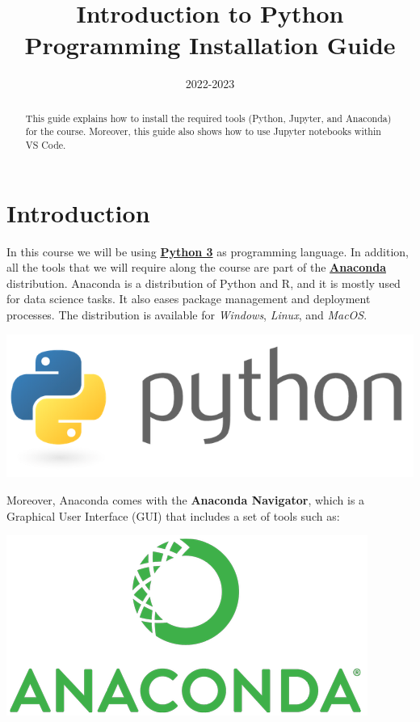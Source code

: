 \documentclass{latex-template/tufte-handout}
\title{Introduction to Python Programming Installation Guide}
\date{2022-2023} %
\begin{document}
\maketitle%

\begin{abstract}
\noindent
This guide explains how to install the required tools (Python, Jupyter, and Anaconda) for the course.
Moreover, this guide also shows how to use Jupyter notebooks within VS Code.

\end{abstract}




\section{Introduction} \label{introduction}



In this course we will be using \href{https://www.python.org}{\textbf{Python 3}} as programming language. In addition, all the tools that we will require along the course are part of the \href{https://anaconda.org}{\textbf{Anaconda}} distribution. 
Anaconda is a distribution of Python and R, and it is mostly used for data science tasks. It also eases package management and deployment processes. The distribution is available for \emph{Windows}, \emph{Linux}, and \emph{MacOS}.
\begin{marginfigure}%
  \includegraphics[width=\linewidth]{assets/python-logo}
  \label{fig:marginfig}
\end{marginfigure}

Moreover, Anaconda comes with the \textbf{Anaconda Navigator}, which is
a Graphical User Interface (GUI) that includes a set of tools such as:
\begin{marginfigure}%
  \includegraphics[width=\linewidth]{assets/anaconda-logo}
  \label{fig:marginfig}
\end{marginfigure}
\end{document}

